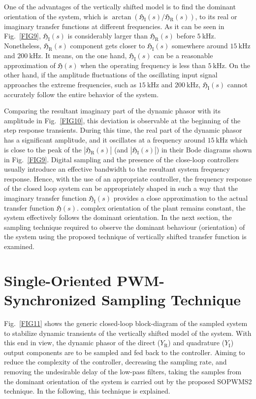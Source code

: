 \documentclass[journal,a4paper,10pt,twoside]{IEEEtran} %
\begin{document}
	 One of the advantages of the vertically shifted model is to find the dominant orientation of the system, {\color{red}which is $\arctan(\mathfrak{H}_\mathrm{I}(s)/\mathfrak{H}_\mathrm{R}(s))$}, to its real or imaginary transfer functions at different frequencies. As it can be seen in 
	 Fig.~\ref{FIG9}, $\mathfrak{H}_\mathrm{I}(s)$ is considerably larger than $\mathfrak{H}_\mathrm{R}(s)$ before $5~\mathrm{kHz}$. Nonetheless, $\mathfrak{H}_\mathrm{R}(s)$ component gets closer to $\mathfrak{H}_\mathrm{I}(s)$ somewhere around $15~\mathrm{kHz}$ and $200~\mathrm{kHz}$. It means, on the one hand, $\mathfrak{H}_\mathrm{I}(s)$ can be a reasonable approximation of $\mathfrak{H}(s)$ when the operating frequency is less than $5~\mathrm{kHz}$. On the other hand, if the amplitude fluctuations of the oscillating input signal approaches the extreme frequencies, such as $15~\mathrm{kHz}$ and $200~\mathrm{kHz}$, $\mathfrak{H}_\mathrm{I}(s)$ cannot accurately follow the entire behavior of the system. 
	 
	 Comparing the resultant imaginary part of the dynamic phasor with its amplitude in Fig.~\ref{FIG10}, this deviation is observable at the beginning of the step response transients. During this time, the real part of the dynamic phasor has a significant amplitude, and it oscillates at a frequency around $15~\mathrm{kHz}$ which is close to the peak of the $\left|\mathfrak{H}_\mathrm{R}(s)\right|$ (and $\left|\mathfrak{H}_\mathrm{I}(s)\right|$) in their Bode diagrams shown in Fig.~\ref{FIG9}. 
	 Digital sampling and the presence of the close-loop controllers usually introduce an effective bandwidth to the resultant system frequency response. Hence, with the use of an appropriate controller, the frequency response of the closed loop system can be appropriately shaped in such a way that the imaginary transfer function $\mathfrak{H}_\mathrm{I}(s)$ provides a close approximation to the actual transfer function $\mathfrak{H}(s)$. complex orientation of the plant remains constant, the system effectively follows the dominant orientation. 
	 In the next section, the sampling technique required to observe the dominant behaviour (orientation) of the system {\color{red}using the proposed technique of vertically shifted transfer function is examined}.
	 
	 \section{Single-Oriented PWM-Synchronized Sampling Technique}
	 Fig.~\ref{FIG11} shows the generic closed-loop block-diagram of the sampled system to stabilize dynamic transients of the vertically shifted model of the system. With this end in view, the dynamic phasor of the direct ($Y_\mathrm{R}$) and quadrature ($Y_\mathrm{I}$) output components are to be sampled and fed back to the controller. Aiming to reduce the complexity of the controller, decreasing the sampling rate, and removing the undesirable delay of the low-pass filters, taking the samples from the dominant orientation of the system is carried out by the proposed SOPWMS2 technique. In the following, this technique is explained.
	 
\end{document}
